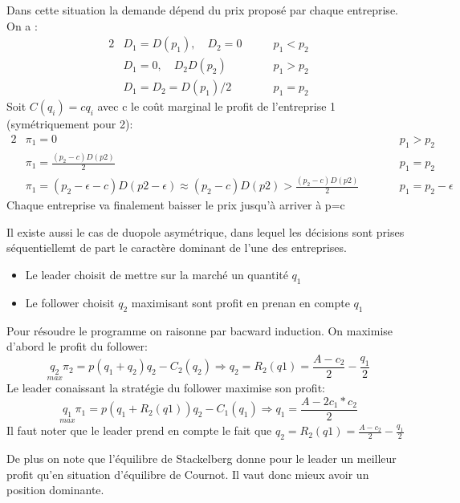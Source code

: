 \begin{tcolorbox}[title=Duopole de Bertrand]
	
	Dans cette situation la demande dépend du prix proposé par chaque entreprise. On a : 
	\begin{alignat*}{2}
		&D_1=D(p_1), \quad D_2=0 \qquad &p_1<p_2 \\
		&D_1=0, \quad D_2D(p_2) \qquad &p_1>p_2 \\
		&D_1=D_2=D(p_1)/2  \qquad &p_1=p_2
	\end{alignat*}
	Soit $C(q_i)=cq_i$ avec c le coût marginal le profit de l'entreprise 1 (symétriquement pour 2):
	\begin{alignat*}{2}
		&\pi_1=0 \qquad &&p_1>p_2 \\
		&\pi_1 = \frac{(p_2-c)D(p2)}{2} \qquad &&p_1=p_2 \\
		&\pi_1= (p_2-\epsilon-c)D(p2-\epsilon) \approx (p_2-c)D(p2)> \frac{(p_2-c)D(p2)}{2} \qquad &&p_1=p_2-\epsilon
	\end{alignat*}
	Chaque entreprise va finalement baisser le prix jusqu'à arriver à p=c
	
\end{tcolorbox}

Il existe aussi le cas de duopole asymétrique, dans lequel les décisions sont prises séquentiellemt de part le caractère dominant de l'une des entreprises.

\begin{tcolorbox}[title=Duopole de Stackelberg]
	
	\begin{itemize}[label=]
		\item Le leader choisit de mettre sur la marché un quantité $q_1$
		\item Le follower choisit $q_2$ maximisant sont profit en prenan en compte $q_1$
	\end{itemize}
	Pour résoudre le programme on raisonne par bacward induction. On maximise d'abord le profit du follower:
	\[
		\underset{max}{q_2}\pi_2 = p(q_1+q_2)q_2-C_2(q_2) \Rightarrow q_2= R_2(q1)= \frac{A-c_2}{2}-\frac{q_1}{2}
	\]
	Le leader conaissant la stratégie du follower maximise son profit:
	\[
		\underset{max}{q_1}\pi_1 = p(q_1+R_2(q1))q_2-C_1(q_1) \Rightarrow q_1= \frac{A-2c_1*c_2}{2}
	\]
	Il faut noter que le leader prend en compte le fait que $q_2= R_2(q1)= \frac{A-c_2}{2}-\frac{q_1}{2}$
	
	De plus on note que l'équilibre de Stackelberg donne pour le leader un meilleur profit qu'en situation d'équilibre de Cournot. Il vaut donc mieux avoir un position dominante.
\end{tcolorbox}

